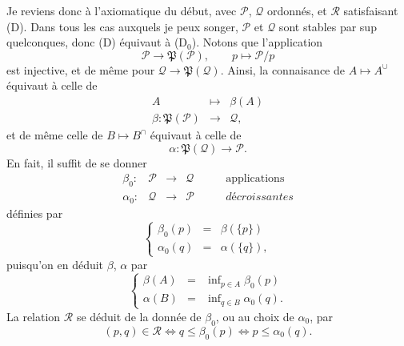 \documentclass[11pt]{article}
\newcommand{\printedpage}[1]{\marginpar{\footnotesize p.~#1}}
\newcommand{\msp}[1]{\marginpar{\footnotesize [#1]}}
\newcommand{\cP}{\mathcal{P}}
\newcommand{\cQ}{\mathcal{Q}}
\newcommand{\cR}{\mathcal{R}}
\newcommand{\fP}{\mathfrak{P}}
\begin{document}
Je reviens donc à l'axiomatique du début, avec $\cP$, $\cQ$ ordonnés, et $\cR$ satisfaisant (D). Dans tous les cas auxquels je peux songer, $\cP$ et $\cQ$ sont stables par sup quelconques, donc (D) équivaut à (D$_0$). Notons que l'application
\[
\cP \longrightarrow \fP(\cP), \qquad p \longmapsto \cP/p
\]
est injective, et de même pour $\cQ \longrightarrow \fP(\cQ)$. Ainsi, la connaisance de $A \longmapsto A^{\cup}$ équivaut à celle de %
\[
\begin{array}{rcl}
A & \longmapsto & \beta(A)\\[0.5ex]
\beta : \fP(\cP) & \longrightarrow & \cQ,
\end{array}
\]
et de même celle de $B \longmapsto B^{\cap}$ équivaut à
\msp{75}
celle de
\[
\alpha : \fP(\cQ) \longrightarrow \cP.
\]
En fait, il suffit de se donner
\[
\begin{array}{rcccl}
\beta_0 : & \cP & \longrightarrow & \cQ & \qquad \text{applications}\\
\alpha_0 : & \cQ & \longrightarrow & \cP & \qquad \textit{décroissantes}
\end{array}
\tag*{(5.15)}
\]
définies par
\[
\left\{
\begin{array}{rcl}
\beta_0(p) & = & \beta(\{p\})\\[1ex]
\alpha_0(q) & = & \alpha(\{q\}),
\end{array}
\right.
\]
puisqu'on en déduit $\beta$, $\alpha$ par
\[
\left\{
\begin{array}{rcl}
\beta(A) & = & \inf\nolimits_{p \in A} \beta_0(p)\\[1ex]
\alpha(B) & = & \inf\nolimits_{q \in B} \alpha_0(q).
\end{array}
\right.
\tag*{(5.16)}
\]
La relation $\cR$ se déduit de la donnée de $\beta_0$, ou au choix de $\alpha_0$, par
\[
(p,q) \in \cR \iff q \leq \beta_0(p) \iff p \leq \alpha_0(q).
\tag*{(5.17)}
\]

\printedpage{47}
\end{document}

